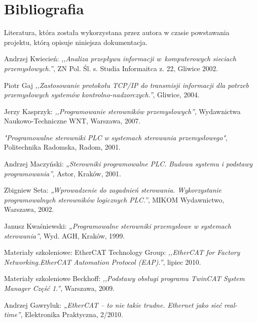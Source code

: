 \section{Bibliografia}
Literatura, która została wykorzystana przez autora w czasie powstawania projektu, którą opisuje niniejsza dokumentacja.

\begin{thebibliography}{99}
Andrzej Kwiecień:
\emph{,,Analiza przepływu informacji w~komputerowych sieciach przemysłowych.''},
ZN Pol. Śl. s. Studia Informaitca z. 22, Gliwice 2002.

Piotr Gaj
\emph{,,Zastosowanie protokołu TCP/IP do transmisji informacji dla potrzeb przemysłowych systemów kontrolno-nadzorczych.''},
Gliwice,
2004.
 
Jerzy Kasprzyk: 
\emph{,,Programowanie sterowników przemysłowych''},
Wydawnictwa Naukowo-Techniczne WNT, 
Warszawa, 
2007.      

\emph{"Programowalne sterowniki PLC w systemach sterowania przemysłowego"}, 
Politechnika Radomska, 
Radom,
2001.

Andrzej Maczyński:
\emph{„Sterowniki programowalne PLC. Budowa systemu i podstawy programowania”},
Astor, 
Kraków,
2001. 

Zbigniew Seta: 
\emph{„Wprowadzenie do zagadnień sterowania. Wykorzystanie programowalnych sterowników logicznych PLC.”},
MIKOM Wydawnictwo, 
Warszawa,
2002. 

Janusz Kwaśniewski: 
\emph{„Programowalne sterowniki przemysłowe w systemach sterowania”}, 
Wyd. AGH, 
Kraków,
1999.

%
Materiały szkoleniowe: EtherCAT Technology Group:
\emph{,,EtherCAT for Factory Networking.EtherCAT Automation Protocol (EAP).''},
lipiec 2010.

Materiały szkoleniowe Beckhoff:
\emph{,,Podstawy obsługi programu TwinCAT System Manager Część 1.''},
Warszawa,
2009.

%

Andrzej Gawryluk:
\emph{„EtherCAT – to nie takie trudne. Ethernet jako sieć real-time”},
Elektronika Praktyczna, 2/2010.


\end{thebibliography}
